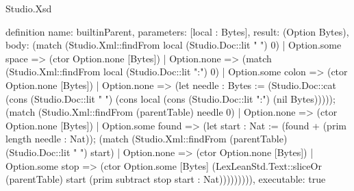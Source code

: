 \begin{lexlean}{Studio.Xsd}
\begin{semanticmodule}
definition{
  name: builtinParent,
  parameters: [local : Bytes],
  result: (Option Bytes),
  body: (match (Studio.Xml::findFrom local (Studio.Doc::lit " ") 0)
    | Option.some space => (ctor Option.none [Bytes])
    | Option.none => (match (Studio.Xml::findFrom local (Studio.Doc::lit ":") 0)
      | Option.some colon => (ctor Option.none [Bytes])
      | Option.none => (let needle : Bytes := (Studio.Doc::cat (cons (Studio.Doc::lit " ") (cons local (cons (Studio.Doc::lit ":") (nil Bytes))))); (match (Studio.Xml::findFrom (parentTable) needle 0)
        | Option.none => (ctor Option.none [Bytes])
        | Option.some found => (let start : Nat := (found + (prim length needle : Nat)); (match (Studio.Xml::findFrom (parentTable) (Studio.Doc::lit " ") start)
          | Option.none => (ctor Option.none [Bytes])
          | Option.some stop => (ctor Option.some [Bytes] (LexLeanStd.Text::sliceOr (parentTable) start (prim subtract stop start : Nat))))))))),
  executable: true
}


\end{semanticmodule}
\end{lexlean}
